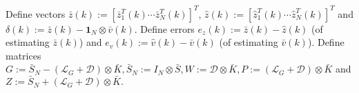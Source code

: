 \documentclass{autart}
\begin{document}
Define vectors $\bar z(k) := [\bar z_1 ^T (k)     \cdots   \bar z_N ^T (k)   ]^T$, $\hat z(k) := [\hat z_1 ^T (k)     \cdots   \hat z_N ^T (k) ]^T$ and $\delta(k):=\bar z(k)- \mathbf 1 _N \otimes \bar v(k)$. Define errors $e_z (k):=\bar z(k)-\hat z(k)$ (of estimating $\bar z(k)$) and $e_v(k):= \hat v(k) - \bar v(k)$ (of estimating $\bar v(k)$). Define matrices
$
G:= \bar S _N - (\mathcal L _G + \mathcal D) \otimes \bar K, \bar S _N := I_N \otimes \bar  S, W:=  \mathcal D  \otimes \bar K, 
P:= (\mathcal L_G +  \mathcal D) \otimes \bar K$ and $Z:=  \bar S _N +  (\mathcal L _G + \mathcal D)  \otimes \bar K. 
$
%
%
%
%
%
\end{document}
